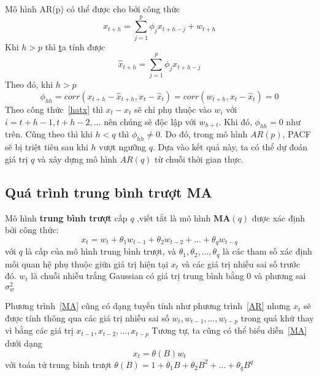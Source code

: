 Mô hình AR(p) có thể được cho bởi công thức 
\begin{equation}
	x_{t+h} = \sum\limits_{j=1}^{p}\phi_{j}x_{t+h-j}+w_{t+h}
\end{equation}
Khi $h > p$ thì \citep{tsa3} \href{theo tài liệu APP trang 160} ta tính được 
\begin{equation}
	\hat{x}_{t+h} = \sum\limits_{j=1}^{p}\phi_{j}x_{t+h-j}
\end{equation} 
Theo đó, khi $h > p$
\begin{equation}
\phi_{hh} = corr(x_{t+h}-\hat{x}_{t+h},x_{t}-\hat{x}_{t}) = corr (w_{t+h},x_t-\hat{x}_t) = 0
\end{equation}
Theo công thức~\ref{hatx} thì $x_{t}-\hat{x}_{t}$ sẽ chỉ phụ thuộc vào $w_i$ với $i=t+h-1,t+h-2,...$ nên chúng sẽ độc lập với $w_{h+t}$. Khi đó, $\phi_{hh} = 0$ như trên. Cũng theo \citep{tsa3} thì khi $h<q$ thì $\phi_{hh}\neq 0$. Do đó, trong mô hình $AR(p)$, PACF sẽ bị triệt tiêu sau khi $h$ vượt ngưỡng $q$. Dựa vào kết quả này, ta có thể dự đoán giá trị $q$ và xây dựng mô hình $AR(q)$ từ chuỗi thời gian thực.

\subsection{Quá trình trung bình trượt MA}
\begin{defi} 
	Mô hình \textbf{trung bình trượt} cấp $q$ ,viết tắt là mô hình $\textbf{MA}(q)$ được xác định bởi công thức:
	\begin{equation}\label{MA}
		x_t = w_t + \theta_1w_{t-1} + \theta_2w_{t-2} +\dots+\theta_qw_{t-q}
	\end{equation}
	với $q$ là cấp của mô hình trung bình trượt, và $\theta_1, \theta_2,\dots,\theta_q$ là các tham số xác định mối quan hệ phụ thuộc giữa giá trị hiện tại $x_t$ và các giá trị nhiễu sai số trước đó. $w_t$ là chuỗi nhiễu trắng Gaussian có giá trị trung bình bằng $0$ và phương sai $\sigma^2_w$
\end{defi}
Phương trình~\ref{MA} cũng có dạng tuyến tính như phương trình~\ref{AR} nhưng $x_t$ sẽ được tính thông qua các giá trị nhiễu sai số $w_t, w_{t-1},\dots,w_{t-p}$ trong quá khứ thay vì bằng các giá trị $x_{t-1},x_{t-2},\dots,x_{t-p}$
Tương tự, ta cũng có thể biểu diễn~\ref{MA} dưới dạng
\begin{equation}
	x_t = \theta(B)w_t
\end{equation}
với toán tử trung bình trượt $\theta(B) = 1+ \theta_1B+\theta_2B^2+...+\theta_qB^q$

